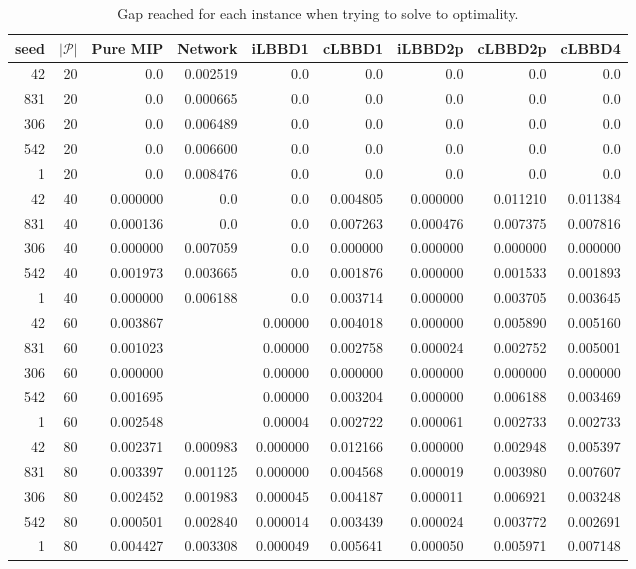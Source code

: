 \begin{table*}
    \centering
    \caption{Gap reached for each instance when trying to solve to optimality.}
    \begin{tabular}{rrrrrrrrr} \toprule
        seed & $|\mathcal{P}|$ & Pure MIP & Network & iLBBD1 & cLBBD1 & iLBBD2p & cLBBD2p & cLBBD4 \\\midrule
        42     &       20 & 0.0 &0.002519&    0.0  &   0.0   &   0.0   &   0.0   &   0.0 \\
        831      &      20 & 0.0 &0.000665&    0.0  &   0.0  &    0.0   &   0.0   &   0.0\\
        306      &      20 & 0.0 &0.006489&    0.0  &   0.0  &    0.0   &   0.0   &   0.0\\
        542      &      20  &0.0 &0.006600&    0.0  &   0.0  &    0.0  &    0.0   &   0.0\\
        1       &     20 & 0.0   &0.008476&  0.0  &   0.0   &   0.0   &   0.0   &   0.0\\\midrule
       42       &     40&  0.000000 &0.0&    0.0&  0.004805&  0.000000 & 0.011210 & 0.011384\\
       831      &      40 & 0.000136 &0.0&    0.0&  0.007263 & 0.000476&  0.007375&  0.007816\\
        306     &       40 & 0.000000 &0.007059&    0.0&  0.000000&  0.000000 & 0.000000&  0.000000\\
       542      &      40&  0.001973  &0.003665&   0.0&  0.001876  &0.000000 & 0.001533 & 0.001893\\
         1      &      40 & 0.000000  &0.006188&   0.0 & 0.003714 & 0.000000 & 0.003705 & 0.003645\\\midrule
        42       &     60&  0.003867&&  0.00000&  0.004018 & 0.000000 & 0.005890 & 0.005160 \\
        831      &      60&  0.001023&&  0.00000&  0.002758&  0.000024&  0.002752&  0.005001\\
        306      &      60&  0.000000&&  0.00000&  0.000000&  0.000000&  0.000000 & 0.000000\\
        542      &      60 & 0.001695&&  0.00000&  0.003204&  0.000000&  0.006188 & 0.003469\\
        1        &    60 & 0.002548&&  0.00004&  0.002722 & 0.000061 & 0.002733 & 0.002733\\\midrule
        42       &     80 & 0.002371 & 0.000983 & 0.000000  &0.012166 & 0.000000  &0.002948  &0.005397\\
        831      &      80 & 0.003397 & 0.001125  &0.000000 & 0.004568 & 0.000019 & 0.003980 & 0.007607\\
        306      &      80 & 0.002452 & 0.001983 & 0.000045 & 0.004187 & 0.000011 & 0.006921 & 0.003248\\
        542      &      80 & 0.000501 & 0.002840 & 0.000014 & 0.003439 & 0.000024 & 0.003772 & 0.002691\\
        1        &    80 & 0.004427 & 0.003308 & 0.000049 & 0.005641 & 0.000050 & 0.005971 & 0.007148\\

      \bottomrule
    \end{tabular}
\end{table*}
